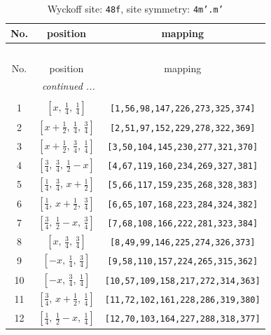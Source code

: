 \documentclass[fleqn,8pt]{jsarticle}
\begin{document}
\begin{longtable}{ccc}
\caption{Wyckoff site: {\tt 48f}, site symmetry: {\tt 4m'.m'}}
 \\
 \hline \hline
No. & position & mapping \\ \hline \endfirsthead

\multicolumn{2}{l}{\tablename\ \thetable{}} \\
 \hline \hline
No. & position & mapping \\ \hline \endhead

 \hline \hline
\multicolumn{2}{r}{\footnotesize\it continued ...} \\ \endfoot

 \hline \hline
\multicolumn{2}{r}{} \\ \endlastfoot

1 & $\left[ x,\, \frac{1}{4},\, \frac{1}{4} \right]$ & {\tt [1,56,98,147,226,273,325,374]} \\ \hline
2 & $\left[ x + \frac{1}{2},\, \frac{1}{4},\, \frac{3}{4} \right]$ & {\tt [2,51,97,152,229,278,322,369]} \\ \hline
3 & $\left[ x + \frac{1}{2},\, \frac{3}{4},\, \frac{1}{4} \right]$ & {\tt [3,50,104,145,230,277,321,370]} \\ \hline
4 & $\left[ \frac{3}{4},\, \frac{3}{4},\, \frac{1}{2} - x \right]$ & {\tt [4,67,119,160,234,269,327,381]} \\ \hline
5 & $\left[ \frac{1}{4},\, \frac{3}{4},\, x + \frac{1}{2} \right]$ & {\tt [5,66,117,159,235,268,328,383]} \\ \hline
6 & $\left[ \frac{1}{4},\, x + \frac{1}{2},\, \frac{3}{4} \right]$ & {\tt [6,65,107,168,223,284,324,382]} \\ \hline
7 & $\left[ \frac{3}{4},\, \frac{1}{2} - x,\, \frac{3}{4} \right]$ & {\tt [7,68,108,166,222,281,323,384]} \\ \hline
8 & $\left[ x,\, \frac{3}{4},\, \frac{3}{4} \right]$ & {\tt [8,49,99,146,225,274,326,373]} \\ \hline
9 & $\left[ - x,\, \frac{1}{4},\, \frac{3}{4} \right]$ & {\tt [9,58,110,157,224,265,315,362]} \\ \hline
10 & $\left[ - x,\, \frac{3}{4},\, \frac{1}{4} \right]$ & {\tt [10,57,109,158,217,272,314,363]} \\ \hline
11 & $\left[ \frac{3}{4},\, x + \frac{1}{2},\, \frac{1}{4} \right]$ & {\tt [11,72,102,161,228,286,319,380]} \\ \hline
12 & $\left[ \frac{1}{4},\, \frac{1}{2} - x,\, \frac{1}{4} \right]$ & {\tt [12,70,103,164,227,288,318,377]} \\ \hline

\end{longtable}
\end{document}
